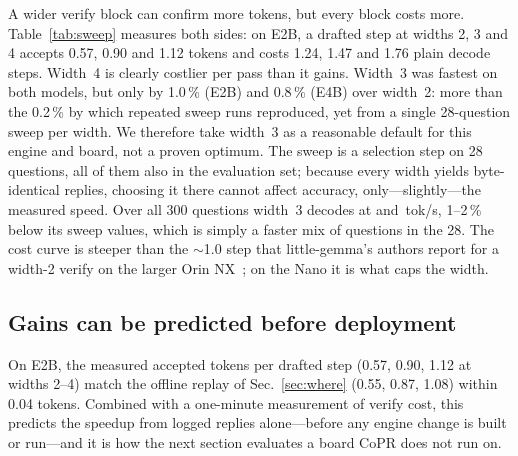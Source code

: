 \documentclass[conference]{IEEEtran}
\newcommand{\sys}{CoPR}
\newcommand{\lgm}{little-gemma}
\begin{document}
A wider verify block can confirm more tokens, but every block costs more.
Table~\ref{tab:sweep} measures both sides: on E2B, a drafted step at widths 2,
3 and 4 accepts 0.57, 0.90 and 1.12 tokens and costs 1.24, 1.47 and 1.76 plain
decode steps. Width~4 is clearly costlier per pass than it gains. Width~3 was
fastest on both models, but only by 1.0\,\% (E2B) and 0.8\,\% (E4B) over
width~2: more than the 0.2\,\% by which repeated sweep runs reproduced, yet from
a single 28-question sweep per width. We therefore take width~3 as a reasonable
default for this engine and board, not a proven optimum. The sweep is a selection step on 28 questions, all of them
also in the evaluation set; because every width yields byte-identical replies,
choosing it there cannot affect accuracy, only---slightly---the measured speed.
Over all 300 questions width~3 decodes at \EtwoDecA{} and \EfourDecA{}\,tok/s,
1--2\,\% below its sweep values, which is simply a faster mix of questions in
the 28. The cost curve is steeper than the $\sim$1.0 step that
\lgm{}'s authors report for a width-2 verify on the larger Orin
NX~\cite{littlegemmarepo}; on the Nano it is what caps the width.

\subsection{Gains can be predicted before deployment}
On E2B, the measured accepted tokens per drafted step (0.57, 0.90, 1.12 at
widths 2--4) match the offline replay of Sec.~\ref{sec:where} (0.55, 0.87,
1.08) within 0.04 tokens. Combined with a
one-minute measurement of verify cost, this predicts the speedup from logged
replies alone---before any engine change is built or run---and it is how the
next section evaluates a board \sys{} does not run on.
\end{document}
